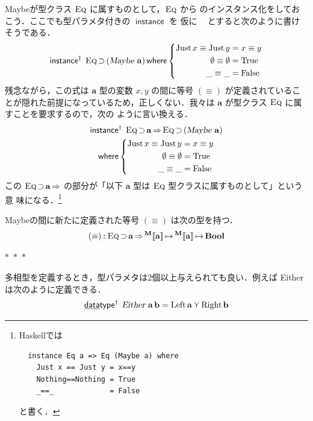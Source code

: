 \documentclass[a5paper,twoside,fleqn,draft]{jsbook}
\def\[{[\![}
\def\]{]\!]}
\newcommand{\separator}{\begin{center}$*$~$*$~$*$\end{center}}
\newcommand{\programminglanguage}[1]{\textsf{#1}}
\newcommand{\haskell}{\programminglanguage{Haskell}}
\newcommand{\mKeyword}[1]{\mathsf{#1}}
\newcommand{\mKeywordUnderline}[1]{\text{\underline{\textsf{#1}}}}
\newcommand{\mDataTypeKeyword}{\mKeywordUnderline{data}\mKeyword{type}}
\newcommand{\mInstanceDeclKeyword}{\mKeyword{instance}}
\newcommand{\mWhereKeyword}{\mKeyword{where}}
\DeclareMathOperator{\mDataTypePolymorphic}{\mDataTypeKeyword^\dagger}
\DeclareMathOperator{\mInstanceDecl}{\mInstanceDeclKeyword}
\DeclareMathOperator{\mInstanceDeclPolymorphic}{\mInstanceDeclKeyword^{\dagger}}
\DeclareMathOperator{\mSuperClass}{\Rightarrow}
\DeclareMathOperator{\mSuperSet}{\supset}
\DeclareMathOperator{\mWhere}{\mWhereKeyword}
\newcommand{\mSpecialConstant}[1]{\textrm{#1}}
\newcommand{\mFalse}{\mSpecialConstant{False}}
\newcommand{\mNothing}{\emptyset}
\newcommand{\mTrue}{\mSpecialConstant{True}}
\DeclareMathOperator{\mIn}{{:\!:}}
\DeclareMathOperator{\mMapsTo}{\mapsto}
\DeclareMathOperator{\mValueOr}{\curlyvee}
\newcommand{\mType}[1]{\mathbf{#1}} %
\newcommand{\mA}{\mType{a}}
\newcommand{\mB}{\mType{b}}
\newcommand{\mBoolType}{\mType{Bool}}
\newcommand{\mTypeAssemble}[2]{{}^\mType{#1}\[\mType{#2}\]}
\newcommand{\mMaybeType}[1]{\mTypeAssemble{M}{#1}}
\newcommand{\mTypeConstructor}[1]{\textsl{#1}}
\DeclareMathOperator{\mEitherTypeConstructor}{\mTypeConstructor{Either}}
\DeclareMathOperator{\mMaybeTypeConstructor}{\mTypeConstructor{Maybe}}
\newcommand{\mValueConstructor}[1]{\mathrm{#1}}
\newcommand{\mValueWith}[2]{\mValueConstructor{#1}\,#2}
\newcommand{\mLeftWith}[1]{\mValueWith{Left}{#1}}
\newcommand{\mRightWith}[1]{\mValueWith{Right}{#1}}
\newcommand{\mJustWith}[1]{\mValueWith{Just}{#1}}
\newcommand{\mTypeClass}[1]{\textsc{#1}} %
\newcommand{\mEqTypeClass}{\mTypeClass{Eq}}
\newcommand{\mProjEXP}[2]{#1\mMapsTo#2} %
\begin{document}
Maybeが型クラス $\mEqTypeClass$ に属すものとして，$\mEqTypeClass$ から
のインスタンス化をしておこう．ここでも型パラメタ付きの $\mInstanceDecl$ を
仮に $\mInstanceDeclPolymorphic$ とすると次のように書けそうである．
\begin{equation}
  \mInstanceDeclPolymorphic\;
  \mEqTypeClass\mSuperSet{}(\mMaybeTypeConstructor\,\mA)
  \mWhere
  \left\{
  \begin{aligned}
    \mJustWith{x}\equiv\mJustWith{y}
    &=x\equiv y\\
    \mNothing\equiv\mNothing
    &=\mTrue\\
    \_\equiv\_
    &=\mFalse
  \end{aligned}
  \right.
\end{equation}
残念ながら，この式は $\mA $ 型の変数 $x,y$ の間に等号 $(\equiv)$
が定義されていることが隠れた前提になっているため，正しくない．我々は
$\mA $ が型クラス $\mEqTypeClass$ に属すことを要求するので，次の
ように言い換える．
\begin{multline}
\mInstanceDeclPolymorphic\;
\mEqTypeClass\mSuperSet\mA
\mSuperClass
\mEqTypeClass\mSuperSet{}(\mMaybeTypeConstructor\,\mA )\\
\mWhere
\left\{
\begin{aligned}
\mJustWith{x}\equiv\mJustWith{y}&=x\equiv y\\
\mNothing\equiv\mNothing&=\mTrue\\
\_\equiv\_&=\mFalse
\end{aligned}
\right.
\end{multline}
この $\mEqTypeClass\mSuperSet\mA \mSuperClass$ の部分が「以下
$\mA $ 型は $\mEqTypeClass$ 型クラスに属すものとして」という意
味になる．\footnote{\haskell では
\begin{verbatim}
  instance Eq a => Eq (Maybe a) where
    Just x == Just y = x==y
    Nothing==Nothing = True
    _==_             = False
\end{verbatim}
と書く．
}

Maybeの間に新たに定義された等号 $(\equiv)$ は次の型を持つ．
\begin{equation}
(\equiv)
\mIn{}\mEqTypeClass\mSuperSet\mA
\mSuperClass\mProjEXP{\mMaybeType{a}}{\mProjEXP{\mMaybeType{a}}{\mBoolType}}
\end{equation}

\separator

多相型を定義するとき，型パラメタは2個以上与えられても良い．例えば
Eitherは次のように定義できる．
\begin{equation}
\mDataTypePolymorphic\;\mEitherTypeConstructor\,\mA \,\mB
=\mLeftWith{\mA }
\mValueOr
\mRightWith{\mB }
\end{equation}
\end{document}
